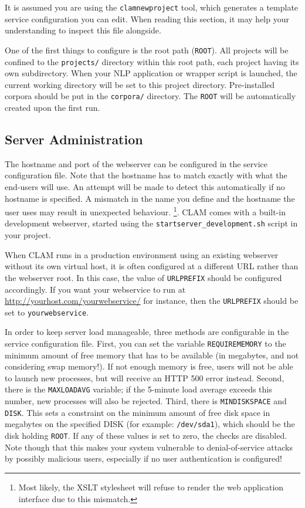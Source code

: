 \documentclass[a4paper,12pt,twoside,openright]{report}
\begin{document}
It is assumed you are using the \texttt{clamnewproject} tool, which generates a
template service configuration you can edit. When reading this section, it may
help your understanding to inspect this file alongside.

One of the first things to configure is the root path (\texttt{ROOT}). All
projects will be confined to the \texttt{projects/} directory within this root
path, each project having its own subdirectory. When your NLP application or
wrapper script is launched, the current working directory will be set to this
project directory. Pre-installed corpora should be put in the \texttt{corpora/}
directory. The \texttt{ROOT} will be automatically created upon the first run.

\subsection{Server Administration}
\label{sec:sadmin}

The hostname and port of the webserver can be configured in the service
configuration file. Note that the hostname has to match exactly with what the
end-users will use. An attempt will be made to detect this automatically if no
hostname is specified. A mismatch in the name you define and the hostname the
user uses may result in unexpected behaviour. \footnote{Most likely, the XSLT
stylesheet will refuse to render the web application interface due to this
mismatch.}. CLAM comes with a built-in development webserver, started using the
\texttt{startserver\_development.sh} script in your project. 

When CLAM runs in a production environment using an existing webserver without
its own virtual host, it is often configured at a different URL rather than the
webserver root. In this case, the value of \texttt{URLPREFIX} should be
configured accordingly. If you want your webservice to run at
\url{http://yourhost.com/yourwebservice/} for instance, then the
\texttt{URLPREFIX} should be set to \texttt{yourwebservice}.

In order to keep server load manageable, three methods are configurable in the
service configuration file. First, you can set the variable
\texttt{REQUIREMEMORY} to the minimum amount of free memory that has to be
available (in megabytes, and not considering swap memory!). If not enough
memory is free, users will not be able to launch new processes, but will
receive an HTTP 500 error instead. Second, there is the \texttt{MAXLOADAVG}
variable; if the 5-minute load average exceeds this number, new processes will
also be rejected. Third, there is \texttt{MINDISKSPACE} and \texttt{DISK}. This
sets a constraint on the minimum amount of free disk space in megabytes on the
specified DISK (for example: \texttt{/dev/sda1}), which should be the disk
holding \texttt{ROOT}. If any of these values is set to zero, the checks are
disabled. Note though that this makes your system vulnerable to
denial-of-service attacks by possibly malicious users, especially if no user
authentication is configured!
\end{document}
